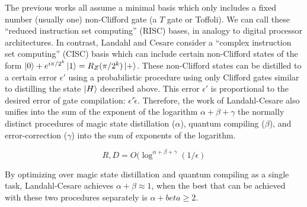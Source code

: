 The previous works all assume a minimal basis which only includes a fixed
number (usually one) non-Clifford gate (a $T$ gate or Toffoli). We can
call these ``reduced instruction set computing'' (RISC) bases, in analogy to
digital processor architectures.
In contrast, Landahl and
Cesare consider a ``complex instruction set computing'' (CISC) basis
\cite{Landahl2012}
which
can include certain non-Clifford states of the form
$\left\vert{0}\right\rangle + e^{i\pi / 2^k} \left\vert{1}\right\rangle = R_Z(\pi/{2^k})\left\vert{+}\right\rangle$. These
non-Clifford states can be distilled to a certain error $\epsilon'$ using
a probabilistic procedure using only Clifford gates similar to distilling
the state $\left\vert{H}\right\rangle$ described above. This error $\epsilon'$ is proportional
to the desired error of gate compilation: $\epsilon' \tilde \epsilon$.
Therefore, the work of Landahl-Cesare also unifies into the sum of the 
exponent of the logarithm $\alpha + \beta + \gamma$ the
normally distinct procedures of
magic state distillation ($\alpha$),
quantum compiling ($\beta$),
and error-correction ($\gamma$) into
the sum of exponents of the logarithm.

\begin{equation}
R,D = O(\log ^{\alpha + \beta + \gamma} (1/\epsilon)
\end{equation}

By optimizing over magic state distillation and quantum compiling as a
single task, Landahl-Cesare achieves $\alpha + \beta \approx 1$, when the
best that can be achieved with these two procedures separately is
$\alpha + beta \ge 2$.


